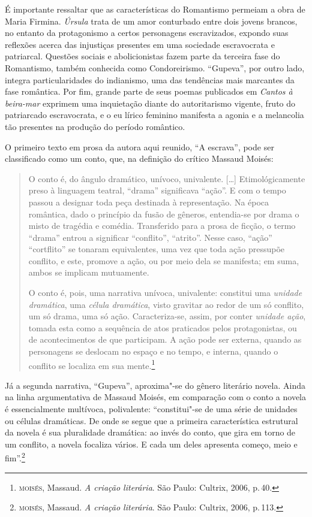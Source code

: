 É importante ressaltar que as características do Romantismo permeiam a
obra de Maria Firmina. \emph{Úrsula} trata de um amor conturbado entre
dois jovens brancos, no entanto da protagonismo a certos personagens
escravizados, expondo suas reflexões acerca das injustiças presentes em
uma sociedade escravocrata e patriarcal. Questões sociais e
abolicionistas fazem parte da terceira fase do Romantismo, também
conhecida como Condoreirismo. ``Gupeva'', por outro lado, integra
particularidades do indianismo, uma das tendências mais marcantes da
fase romântica. Por fim, grande parte de seus poemas publicados em
\emph{Cantos à beira-mar} exprimem uma inquietação diante do
autoritarismo vigente, fruto do patriarcado escravocrata, e o eu lírico
feminino manifesta a agonia e a melancolia tão presentes na produção do
período romântico.

O primeiro texto em prosa da autora aqui reunido, ``A escrava'', pode ser classificado como um conto, que, na definição do crítico Massaud Moisés:

\begin{quote}
O conto é, do ângulo dramático, unívoco, univalente. [\ldots]
Etimológicamente preso à linguagem teatral,
``drama'' significava ``ação''. E com o tempo passou a designar
toda peça destinada à representação. Na época romântica, dado o
princípio da fusão de gêneros, entendia-se por drama o misto de
tragédia e comédia. Transferido para a prosa de ficção, o termo
``drama'' entrou a significar ``conflito'', ``atrito''. Nesse caso,
``ação'' ``cortflito'' se tonaram equivalentes, uma vez que toda
ação pressupõe conflito, e este, promove a ação, ou por meio dela
se manifesta; em suma, ambos se implicam mutuamente.

O conto é, pois, uma narrativa unívoca, univalente: constitui
uma \textit{unidade dramática}, uma \textit{célula dramática}, visto gravitar ao
redor de um só conflito, um só drama, uma só ação. Caracteriza-se,
assim, por conter \textit{unidade ação}, tomada esta como a sequência de atos praticados pelos protagonistas, ou de acontecimentos de
que participam. A ação pode ser externa, quando as personagens se
deslocam no espaço e no tempo, e interna, quando o conflito se
localiza em sua mente.\footnote{\textsc{moisés}, Massaud. \textit{A criação literária}. São Paulo: Cultrix, 2006, p.\,40.}
\end{quote}

Já a segunda narrativa, ``Gupeva'', aproxima"-se do gênero literário novela.
Ainda na linha argumentativa de Massaud Moisés, em comparação com o conto a novela é
essencialmente multívoca, polivalente: ``constitui"-se de uma série de unidades ou células dramáticas. De onde se segue que a primeira característica estrutural da novela é sua pluralidade dramática: ao invés do conto, que gira em torno de um conflito, a novela focaliza vários. E cada um deles apresenta começo, meio e fim''.\footnote{\textsc{moisés}, Massaud. \textit{A criação literária}. São Paulo: Cultrix, 2006, p.\,113.}

